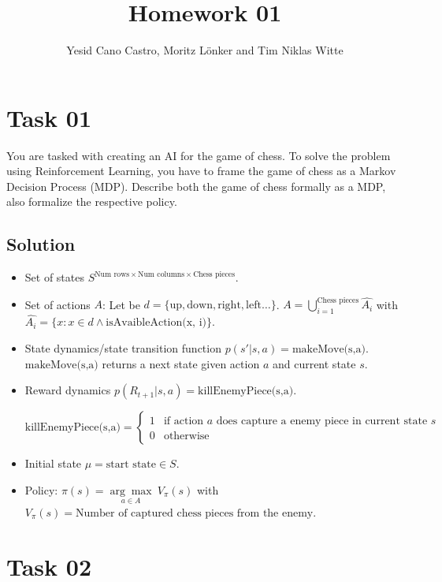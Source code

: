 \documentclass[a4paper,12pt]{scrartcl}
\title{Homework 01}
\author{Yesid Cano Castro, Moritz Lönker and Tim Niklas Witte}
\date{}
\begin{document}
{
\let\clearpage\relax
\maketitle
}

\section*{Task 01}


You are tasked with creating an AI for the game of chess. To solve the problem
using Reinforcement Learning, you have to frame the game of chess as a Markov
Decision Process (MDP). Describe both the game of chess formally as a MDP,
also formalize the respective policy.

\subsection*{Solution}

\begin{itemize}
 \item Set of states $S^{ \textrm{Num rows} \times \textrm{Num columns} \times \textrm{Chess pieces} }$.
 \item Set of actions $A$: Let be $d = \{\textrm{up}, \textrm{down}, \textrm{right}, \textrm{left}\dots\}$.
  $A = \bigcup\limits_{i=1}^{\textrm{Chess pieces}} \hat{A_i}$ with $\hat{A_i} = \{x : x\in d \land \textrm{isAvaibleAction(x, i)} \}$. 
  \item State dynamics/state transition function $p(s'|s,a) = \textrm{makeMove(s,a)}$. $\textrm{makeMove(s,a)}$ returns a next state given action $a$ and current state $s$.
  \item Reward dynamics $p(R_{t+1}|s,a) = \textrm{killEnemyPiece(s,a)}$.
  
  $
  \textrm{killEnemyPiece(s,a)} =
  \left\{
	\begin{array}{ll}
		1  & \mbox{if } \textrm{action $a$ does capture a enemy piece in current state $s$} \\
		0 & \mbox{otherwise }
	\end{array}
\right.
$
  \item Initial state $\mu = \textrm{start state} \in S$.
  
  \item Policy: $\pi(s) = \underset{a \in A}{\arg\max} \ V_\pi(s)$ with $V_\pi(s) = \textrm{Number of captured chess pieces from the enemy}$.   
\end{itemize}

\section*{Task 02}
\end{document}
